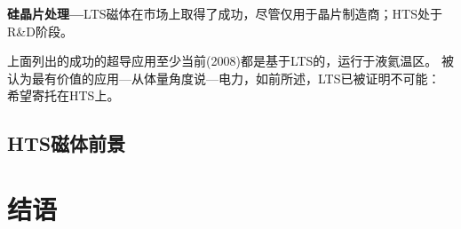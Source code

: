 \textbf{硅晶片处理---}LTS磁体在市场上取得了成功，尽管仅用于晶片制造商；HTS处于R\&D阶段。

上面列出的成功的超导应用至少当前(2008)都是基于LTS的，运行于液氦温区。
被认为最有价值的应用---从体量角度说---电力，如前所述，LTS已被证明不可能：
希望寄托在HTS上。

\subsection{HTS磁体前景}



\section{结语}
